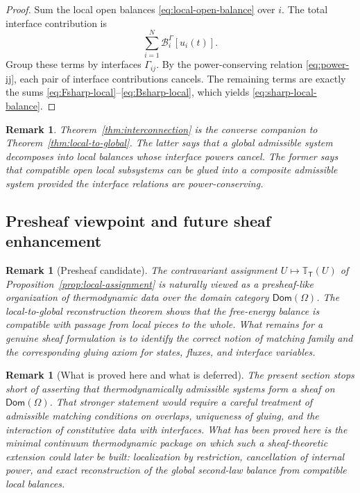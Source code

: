 \documentclass[11pt]{article}
\newtheorem{remark}[theorem]{Remark}
\newcommand{\Om}{\Omega}
\newcommand{\Bnd}{\mathcal{B}}
\begin{document}
\begin{proof}
Sum the local open balances \eqref{eq:local-open-balance} over \(i\). The total
interface contribution is
\[
\sum_{i=1}^N \Bnd_i^{\Gamma}[u_i(t)].
\]
Group these terms by interfaces \(\Gamma_{ij}\). By the power-conserving relation
\eqref{eq:power-ij}, each pair of interface contributions cancels. The remaining
terms are exactly the sums \eqref{eq:Fsharp-local}--\eqref{eq:Bsharp-local}, which
yields \eqref{eq:sharp-local-balance}.
\end{proof}

\begin{remark}
Theorem~\ref{thm:interconnection} is the converse companion to
Theorem~\ref{thm:local-to-global}. The latter says that a global admissible system
decomposes into local balances whose interface powers cancel. The former says that
compatible open local subsystems can be glued into a composite admissible system
provided the interface relations are power-conserving.
\end{remark}

\subsection{Presheaf viewpoint and future sheaf enhancement}

\begin{remark}[Presheaf candidate]
The contravariant assignment \(U\mapsto \mathbb{T}_{\mathsf{T}}(U)\) of
Proposition~\ref{prop:local-assignment} is naturally viewed as a presheaf-like
organization of thermodynamic data over the domain category \(\mathsf{Dom}(\Om)\).
The local-to-global reconstruction theorem shows that the free-energy balance is
compatible with passage from local pieces to the whole. What remains for a genuine
sheaf formulation is to identify the correct notion of matching family and the
corresponding gluing axiom for states, fluxes, and interface variables.
\end{remark}

\begin{remark}[What is proved here and what is deferred]
The present section stops short of asserting that thermodynamically admissible
systems form a sheaf on \(\mathsf{Dom}(\Om)\). That stronger statement would require a
careful treatment of admissible matching conditions on overlaps, uniqueness of gluing,
and the interaction of constitutive data with interfaces. What has been proved here
is the minimal continuum thermodynamic package on which such a sheaf-theoretic
extension could later be built: localization by restriction, cancellation of internal
power, and exact reconstruction of the global second-law balance from compatible local
balances.
\end{remark}
\end{document}
